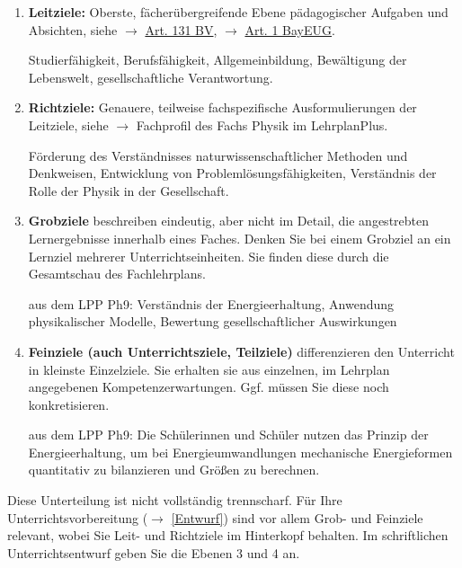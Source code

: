 \begin{enumerate}
	\item \textbf{Leitziele:} Oberste, fächerübergreifende Ebene pädagogischer Aufgaben und Absichten, siehe $\to$ \href{https://www.gesetze-bayern.de/Content/Document/BayVerf-131}{Art. 131 BV}, $\to$ \href{https://www.gesetze-bayern.de/Content/Document/BayEUG-1}{Art. 1 BayEUG}.
	\begin{beisp}
		Studierf\"{a}higkeit, Berufsf\"{a}higkeit, Allgemeinbildung, Bew\"{a}ltigung der Lebenswelt, gesellschaftliche Verantwortung.
	\end{beisp}

	\item \textbf{Richtziele:} Genauere, teilweise fachspezifische Ausformulierungen der Leitziele, siehe $\to$ Fachprofil des Fachs Physik im LehrplanPlus.
	\begin{beisp}
		Förderung des Verständnisses naturwissenschaftlicher Methoden und Denkweisen, Entwicklung von Problemlösungsfähigkeiten, Verständnis der Rolle der Physik in der Gesellschaft.
	\end{beisp}


	\item \textbf{Grobziele} beschreiben eindeutig, aber nicht im Detail, die angestrebten Lernergebnisse innerhalb eines Faches. Denken Sie bei einem Grobziel an ein Lernziel mehrerer Unterrichtseinheiten. Sie finden diese durch die Gesamtschau des Fachlehrplans.

	\begin{beisp}
		aus dem LPP Ph9: Verständnis der Energieerhaltung, Anwendung physikalischer Modelle, Bewertung gesellschaftlicher Auswirkungen
	\end{beisp}

	\item \textbf{Feinziele (auch Unterrichtsziele, Teilziele)} differenzieren den Unterricht in kleinste Einzelziele. Sie erhalten sie aus einzelnen, im Lehrplan angegebenen Kompetenzerwartungen. Ggf. müssen Sie diese noch konkretisieren.

	\begin{beisp}
		aus dem LPP Ph9: Die Schülerinnen und Schüler nutzen das Prinzip der Energieerhaltung, um bei Energieumwandlungen mechanische Energieformen quantitativ zu bilanzieren und Größen zu berechnen.
	\end{beisp}
\end{enumerate}

Diese Unterteilung ist nicht vollständig trennscharf. Für Ihre Unterrichtsvorbereitung ($\to$ \cref{Entwurf}) sind vor allem Grob- und Feinziele relevant, wobei Sie Leit- und Richtziele im Hinterkopf behalten. Im schriftlichen Unterrichtsentwurf geben Sie die Ebenen 3 und 4 an.

